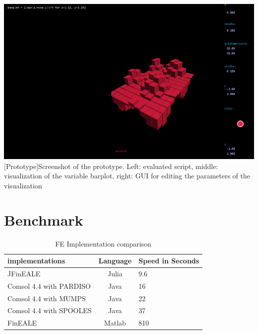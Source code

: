 \begin{appendix}
\begin{minipage}{\linewidth}
    \centering
    \includegraphics[scale=2.0]{graphics/screenshot.png}
    [Prototype]{Screenshot of the prototype. Left: evaluated script, middle: visualization of the variable barplot, right: GUI for editing the parameters of the visualization}
    \label{app:screenshot}
\end{minipage}

\section{Benchmark}

\begin{table}[htb]
\centering
\caption{FE Implementation comparison}
    \sffamily 
    \begin{tabularx}{1.0\textwidth}{l | c | p{5cm}}
        \hline
        implementations         & Language  & Speed in Seconds \\
        \hline
        JFinEALE                & Julia     & 9.6   \\
        Comsol 4.4 with PARDISO & Java      & 16    \\
        Comsol 4.4 with MUMPS   & Java      & 22    \\ 
        Comsol 4.4 with SPOOLES & Java      & 37    \\ 
        FinEALE                 & Matlab    & 810   \\
        \hline
    \end{tabularx} 
    \normalfont
    \label{table:FEComparison}
\end{table}


\end{appendix}
